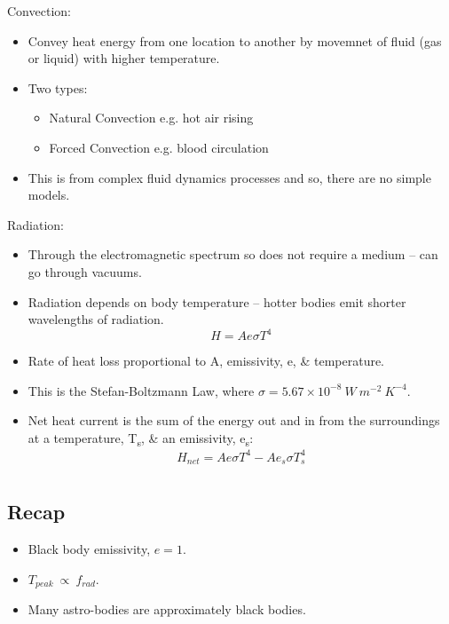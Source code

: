 \documentclass[a4paper, 11pt, normalem]{report}
\begin{document}
Convection: 
\begin{itemize}
    \item Convey heat energy from one location to another by movemnet of fluid (gas or liquid) with higher temperature. 
    \item Two types:
        \begin{itemize}
        	\item Natural Convection e.g. hot air rising
        	\item Forced Convection e.g. blood circulation
        \end{itemize}
    \item This is from complex fluid dynamics processes and so, there are no simple models.
\end{itemize}

Radiation: 
\begin{itemize}
    \item Through the electromagnetic spectrum so does not require a medium -- can go through vacuums.
    \item Radiation depends on body temperature -- hotter bodies emit shorter wavelengths of radiation.
        \begin{equation}
        	H = Ae{\sigma}T^{4}
        \end{equation}
    \item Rate of heat loss proportional to A, emissivity, e, \& temperature.
    \item This is the Stefan-Boltzmann Law, where $\sigma = 5.67\times10^{-8}~W~m^{-2}~K^{-4}$.
    \item Net heat current is the sum of the energy out and in from the surroundings at a temperature, T\textsubscript{s}, \& an emissivity, e\textsubscript{s}:
        \begin{equation}
        	H_{net} = Ae{\sigma}T^{4} - Ae_{s}{\sigma}T^{4}_{s}
        \end{equation}
\end{itemize}

\chapter{}
\section{Recap}
\begin{itemize}
    \item Black body emissivity, $e = 1$.
    \item $T_{peak} ~\propto~f_{rad}$.
    \item Many astro-bodies are approximately black bodies.
\end{itemize}
\end{document}
